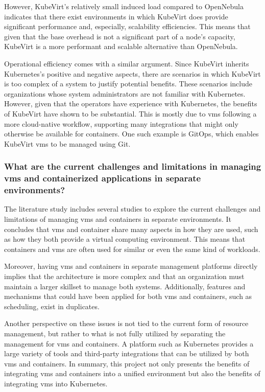 \documentclass{kththesis}
\begin{document}
\begin{enumerate}
However, KubeVirt's relatively small induced load compared to OpenNebula indicates that there exist environments in which KubeVirt does provide significant performance and, especially, scalability efficiencies. This means that given that the base overhead is not a significant part of a node's capacity, KubeVirt is a more performant and scalable alternative than OpenNebula. 

Operational efficiency comes with a similar argument. Since KubeVirt inherits Kubernetes's positive and negative aspects, there are scenarios in which KubeVirt is too complex of a system to justify potential benefits. These scenarios include organizations whose system administrators are not familiar with Kubernetes. However, given that the operators have experience with Kubernetes, the benefits of KubeVirt have shown to be substantial. This is mostly due to \Glspl{vm} following a more cloud-native workflow, supporting many integrations that might only otherwise be available for containers. One such example is GitOps, which enables KubeVirt \Glspl{vm} to be managed using Git. 

\subsubsection*{What are the current challenges and limitations in managing \Glspl{vm} and containerized applications in separate environments?}
The literature study includes several studies to explore the current challenges and limitations of managing \Glspl{vm} and containers in separate environments. It concludes that \Glspl{vm} and container share many aspects in how they are used, such as how they both provide a virtual computing environment. This means that containers and \Glspl{vm} are often used for similar or even the same kind of workloads. 

Moreover, having \Glspl{vm} and containers in separate management platforms directly implies that the architecture is more complex and that an organization must maintain a larger skillset to manage both systems. Additionally, features and mechanisms that could have been applied for both \Glspl{vm} and containers, such as scheduling, exist in duplicates. 

Another perspective on these issues is not tied to the current form of resource management, but rather to what is not fully utilized by separating the management for \Glspl{vm} and containers. A platform such as Kubernetes provides a large variety of tools and third-party integrations that can be utilized by both \Glspl{vm} and containers. In summary, this project not only presents the benefits of integrating \Glspl{vm} and containers into a unified environment but also the benefits of integrating \Glspl{vm} into Kubernetes. 


\end{enumerate}
\end{document}
